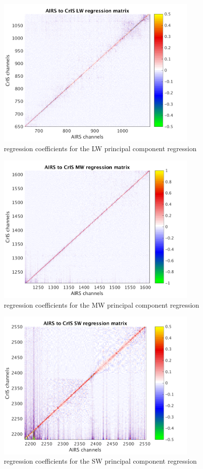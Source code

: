 \documentclass[11pt]{article}
\begin{document}
\begin{figure} %
  \centering
  \includegraphics[height=7.5cm]{slackfigs/LW_pc_regr_mat.png}
  \caption{regression coefficients for the LW principal component
    regression}
  \label{dreg7}
\end{figure}

\begin{figure} %
  \centering
  \includegraphics[height=7.5cm]{slackfigs/MW_pc_regr_mat.png}
  \caption{regression coefficients for the MW principal component
    regression}
  \label{dreg8}
\end{figure}

\begin{figure} %
  \centering
  \includegraphics[height=7.5cm]{slackfigs/SW_pc_regr_mat.png}
  \caption{regression coefficients for the SW principal component
    regression}
  \label{dreg9}
\end{figure}
\end{document}
